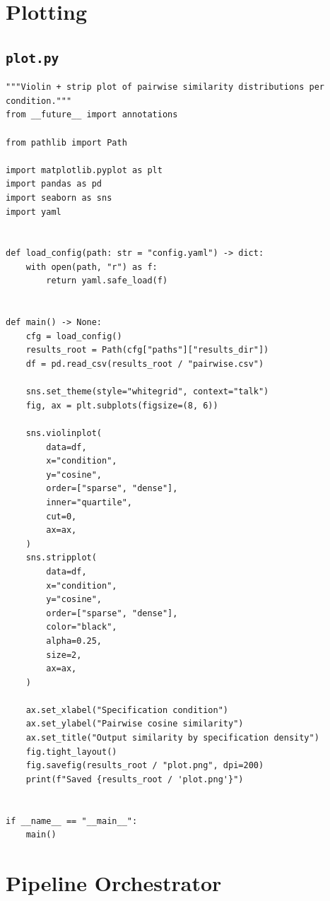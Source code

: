 \documentclass[11pt]{article}
\begin{document}
\newpage

\section{Plotting}

\subsection{\texttt{plot.py}}

\begin{lstlisting}
"""Violin + strip plot of pairwise similarity distributions per condition."""
from __future__ import annotations

from pathlib import Path

import matplotlib.pyplot as plt
import pandas as pd
import seaborn as sns
import yaml


def load_config(path: str = "config.yaml") -> dict:
    with open(path, "r") as f:
        return yaml.safe_load(f)


def main() -> None:
    cfg = load_config()
    results_root = Path(cfg["paths"]["results_dir"])
    df = pd.read_csv(results_root / "pairwise.csv")

    sns.set_theme(style="whitegrid", context="talk")
    fig, ax = plt.subplots(figsize=(8, 6))

    sns.violinplot(
        data=df,
        x="condition",
        y="cosine",
        order=["sparse", "dense"],
        inner="quartile",
        cut=0,
        ax=ax,
    )
    sns.stripplot(
        data=df,
        x="condition",
        y="cosine",
        order=["sparse", "dense"],
        color="black",
        alpha=0.25,
        size=2,
        ax=ax,
    )

    ax.set_xlabel("Specification condition")
    ax.set_ylabel("Pairwise cosine similarity")
    ax.set_title("Output similarity by specification density")
    fig.tight_layout()
    fig.savefig(results_root / "plot.png", dpi=200)
    print(f"Saved {results_root / 'plot.png'}")


if __name__ == "__main__":
    main()
\end{lstlisting}

\newpage

\section{Pipeline Orchestrator}
\end{document}
